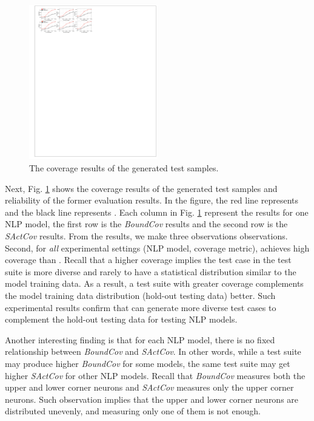 
\begin{figure}
    \centering
    \includegraphics[width=0.5\textwidth]{figs/covergae.pdf}
    \caption{The coverage results of the generated test
      samples. }
    \label{fig:coverage}
\end{figure}

Next, Fig. \ref{fig:coverage} shows the coverage results of the
generated test samples and reliability of the former evaluation
results. In the figure, the red line represents \tool and the black
line represents \Cklst. Each column in Fig. \ref{fig:coverage}
represent the results for one NLP model, the first row is the
\textit{BoundCov} results and the second row is the \textit{SActCov}
results.  From the results, we make three observations
observations.   Second, for \emph{all} experimental settings (\eg NLP
model, coverage metric), \tool achieves high coverage than
\Cklst. Recall that a higher coverage implies the test case in the
test suite is more diverse and rarely to have a statistical
distribution similar to the model training data. As a result, a test
suite with greater coverage complements the model training data
distribution (\ie hold-out testing data) better.    Such experimental
results confirm that \tool can generate more diverse test cases to
complement the hold-out testing data for testing NLP models.   

Another interesting finding is that for each NLP model, there is no
fixed relationship between \textit{BoundCov} and \textit{SActCov}. In
other words, while a test suite may produce higher \textit{BoundCov}
for some models, the same test suite may get higher \textit{SActCov}
for other NLP models.  Recall that \textit{BoundCov} measures both the
upper and lower corner neurons and \textit{SActCov} measures only the
upper corner neurons.  Such observation implies that the upper and
lower corner neurons are distributed unevenly, and measuring only one
of them is not enough.
